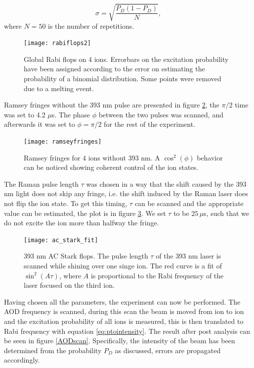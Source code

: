 \begin{equation}
\sigma = \sqrt{\frac{P_{D}(1-P_{D})}{N}},
\end{equation}
where $N = 50$ is the number of repetitions.
\begin{figure}
\centering
\texttt{[image: rabiflops2]}
\caption{Global Rabi flops on 4 ions. Errorbars on the excitation probability have been assigned according to the error on estimating the probability of a binomial distribution. Some points were removed due to a melting event.}
\label{rabiflops4}
\end{figure}
Ramsey fringes without the 393 nm pulse are presented in figure \ref{ramseyfringes}, the $\pi/2$ time was set to 4.2 $\mu$s. The phase $\phi$ between the two pulses was scanned, and afterwards it was set to $\phi = \pi/2$ for the rest of the experiment.
\begin{figure}[H]
\centering
\texttt{[image: ramseyfringes]}
\caption{Ramsey fringes for 4 ions without 393 nm. A $\cos^2(\phi)$ behavior can be noticed showing coherent control of the ion states.}
\label{ramseyfringes}
\end{figure}
The Raman pulse length $\tau$ was chosen in a way that the shift caused by the 393 nm light does not skip any fringe, i.e. the shift induced by the Raman laser does not flip the ion state. To get this timing, $\tau$ can be scanned and the appropriate value can be estimated, the plot is in figure \ref{ACscan}. We set $\tau$ to be $25\,\mu$s, such that we do not excite the ion more than halfway the fringe.
\begin{figure}[H]
\centering
\texttt{[image: ac\_stark\_fit]}
\caption{393 nm AC Stark flops. The pulse length $\tau$ of the 393 nm laser is scanned while shining over one singe ion. The red curve is a fit of $\sin^2(A\tau)$, where $A$ is proportional to the Rabi frequency of the laser focused on the third ion.}
\label{ACscan}
\end{figure}
Having chosen all the parameters, the experiment can now be performed. The AOD frequency is scanned, during this scan the beam is moved from ion to ion and the excitation probability of all ions is measured, this is then translated to Rabi frequency with equation \eqref{eq:ptointensity}. The result after post analysis can be seen in figure \ref{AODscan}. Specifically, the intensity of the beam has been determined from the probability $P_D$ as discussed, errors are propagated accordingly.
